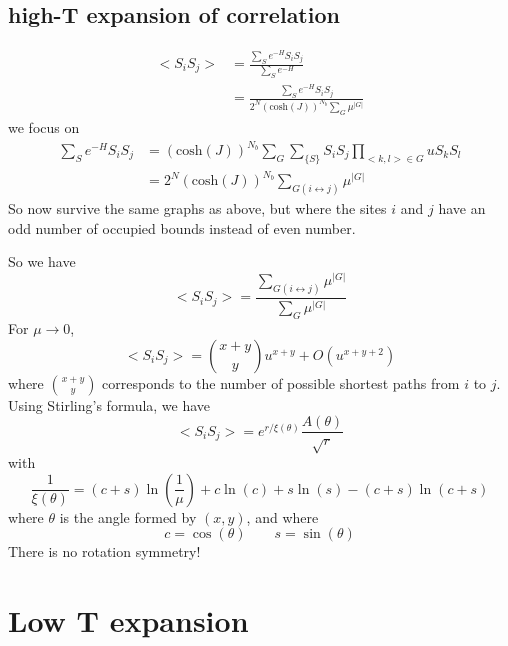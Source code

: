 \documentclass[a4paper]{book}
\theoremstyle{definition}
\theoremstyle{remark}
\begin{document}
\subsection{high-T expansion of correlation}
\begin{equation}
    \begin{aligned}
        <S_iS_j> &= \frac{\sum_S e^{-H} S_iS_j}{\sum_S e^{-H}} \\
        &= \frac{\sum_S e^{-H} S_iS_j}{2^N (\text{cosh}(J))^{N_b}\sum_G \mu^{|G|}}
    \end{aligned}
\end{equation}
we focus on 
\begin{equation}
    \begin{aligned}
        \sum_S e^{-H} S_iS_j &= (\text{cosh}(J))^{N_b}\sum_G \sum_{\{S\}} S_iS_j \prod_{<k, l> \in G} uS_kS_l \\ 
        &= 2^N(\text{cosh}(J))^{N_b}\sum_{G (i \leftrightarrow j)} \mu^{|G|}
    \end{aligned}
\end{equation}
So now survive the same graphs as above, but where the sites $i$ and $j$ have an odd number of occupied bounds instead of even number. \par 
So we have 
\begin{equation}
    <S_iS_j> = \frac{\sum_{G (i \leftrightarrow j)} \mu^{|G|}}{\sum_{G } \mu^{|G|}}
\end{equation}
For $\mu \rightarrow 0$, 
\begin{equation}
    <S_iS_j> = \binom{x + y}{y}u^{x + y} + O(u^{x + y + 2})
\end{equation}
where $\binom{x + y}{y}$ corresponds to the number of possible shortest paths from $i$ to $j$. Using Stirling's formula, we have 
\begin{equation}
    <S_iS_j> = e^{r/\xi(\theta)}\frac{A(\theta)}{\sqrt{r}}
\end{equation}
with 
\begin{equation}
    \frac{1}{\xi(\theta)} = (c + s)\ln(\frac{1}{\mu}) + c\ln(c) + s\ln(s) - (c+s)\ln(c + s)
\end{equation}
where $\theta$ is the angle formed by $(x, y)$, and where 
\begin{equation}
    c = \cos(\theta) \qquad s = \sin(\theta) 
\end{equation}
There is no rotation symmetry!\par \bigskip 

\section{Low T expansion}
\end{document}
